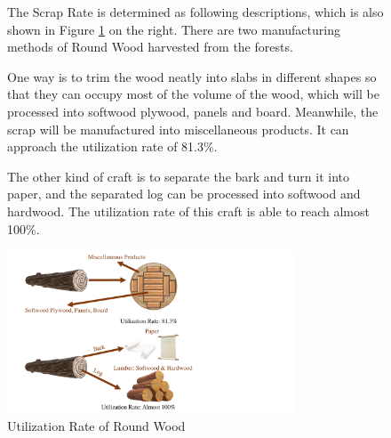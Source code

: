 \documentclass{mcmthesis}
\numberwithin{figure}{section}
\numberwithin{table}{section}
\numberwithin{equation}{section}
\begin{document}
\begin{figure}[ht]
  \begin{minipage}[htbp]{0.42\linewidth}
    The Scrap Rate is determined as following descriptions, which is also shown 
    in Figure \ref{RoundWood} on the right. There are two 
    manufacturing methods of Round Wood harvested from the forests. 
    \par
    One way is to trim the wood neatly into slabs in different shapes so that they can
    occupy most of the volume of the wood, which will be processed into softwood plywood, 
    panels and board. Meanwhile, the scrap will be manufactured into miscellaneous 
    products. It can approach the utilization rate of 81.3\%.
    \par
    The other kind of craft is to separate the bark and turn it into paper, and 
    the separated log can be processed into softwood and hardwood. The utilization 
    rate of this craft is able to reach almost 100\%.
  \end{minipage}
  \hfill
  \begin{minipage}[htbp]{0.5\linewidth}
    \begin{flushright}
      \includegraphics[width = 8.61cm]{code&pic/Roundwood cutting ways.pdf}
      \caption{Utilization Rate of Round Wood}\label{RoundWood}
    \end{flushright}
  \end{minipage}
  \end{figure}
\end{document}
